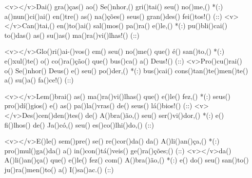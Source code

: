 <v></v>Dai() gra()ças() ao() Se()nhor,() gri()tai() seu() no()me,() *(:)
a()nun()ci()ai() en()tre() as() na()ções() seus() gran()des() fei()tos!() (::)
<v></v>Can()tai,() en()to()ai() sal()mos() pa()ra() e()le,() *(:)
pu()bli()cai() to()das() as() su()as() ma()ra()vi()lhas!() (::)

<v></v>Glo()ri()ai-()vos() em() seu() no()me() que() é() san()to,() *(:)
e()xul()te() o() co()ra()ção() que() bus()ca() a() Deus!() (::)
<v>Pro()cu()rai() o() Se()nhor() Deus() e() seu() po()der,() *(:)
bus()cai() cons()tan()te()men()te() a() su()a() fa()ce!() (::)

<v></v>Lem()brai() as() ma()ra()vi()lhas() que() e()le() fez,() *(:)
seus() pro()dí()gios() e() as() pa()la()vras() de() seus() lá()bios!() (::)
<v></v>Des()cen()den()tes() de() A()bra()ão,() seu() ser()vi()dor,() *(:)
e() fi()lhos() de() Ja()có,() seu() es()co()lhi()do,() (::)

<v></v>E()le() sem()pre() se() re()cor()da() da() A()li()an()ça,() *(:)
pro()mul()ga()da() a() in()con()tá()veis() ge()ra()ções;() (::)
<v></v>da() A()li()an()ça() que() e()le() fez() com() A()bra()ão,() *(:)
e() do() seu() san()to() ju()ra()men()to() a() I()sa()ac.() (::)